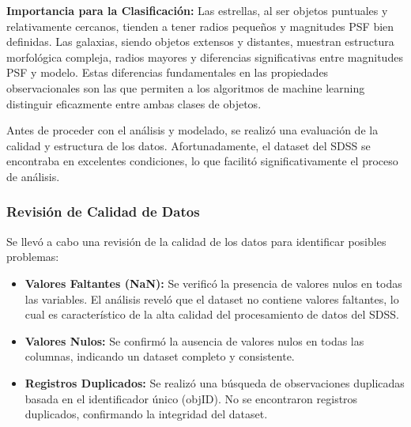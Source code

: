 \documentclass{article}
\begin{document}
\textbf{Importancia para la Clasificación:} Las estrellas, al ser objetos puntuales y relativamente cercanos, tienden a tener radios pequeños y magnitudes PSF bien definidas. Las galaxias, siendo objetos extensos y distantes, muestran estructura morfológica compleja, radios mayores y diferencias significativas entre magnitudes PSF y modelo. Estas diferencias fundamentales en las propiedades observacionales son las que permiten a los algoritmos de machine learning distinguir eficazmente entre ambas clases de objetos.



Antes de proceder con el análisis y modelado, se realizó una evaluación de la calidad y estructura de los datos. Afortunadamente, el dataset del SDSS se encontraba en excelentes condiciones, lo que facilitó significativamente el proceso de análisis.

\subsubsection{Revisión de Calidad de Datos}

Se llevó a cabo una revisión de la calidad de los datos para identificar posibles problemas:

\begin{itemize}
    \item \textbf{Valores Faltantes (NaN):} Se verificó la presencia de valores nulos en todas las variables. El análisis reveló que el dataset no contiene valores faltantes, lo cual es característico de la alta calidad del procesamiento de datos del SDSS.
    
    \item \textbf{Valores Nulos:} Se confirmó la ausencia de valores nulos en todas las columnas, indicando un dataset completo y consistente.
    
    \item \textbf{Registros Duplicados:} Se realizó una búsqueda de observaciones duplicadas basada en el identificador único (objID). No se encontraron registros duplicados, confirmando la integridad del dataset.
\end{itemize}
\end{document}
